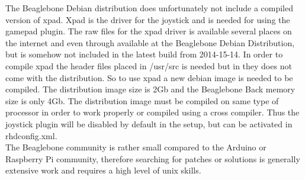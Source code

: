 \noindent
The Beaglebone Debian distribution does unfortunately not include a compiled version of xpad. Xpad is the driver for the joystick and is needed for using the gamepad plugin. The raw files for the xpad driver is available several places on the internet and even through available at the Beaglebone Debian Distribution, but is somehow not included in the latest build from 2014-15-14. In order to compile xpad the header files placed in /usr/src is needed but in they does not come with the distribution. So to use xpad a new debian image is needed to be compiled. The distribution image size is 2Gb and the Beaglebone Back memory size is only 4Gb. The distribution image must be compiled on same type of processor in order to work properly or compiled using a cross compiler. Thus the joystick plugin will be disabled by default in the setup, but can be activated in rhdconfig.xml.\\

\noindent
The Beaglebone community is rather small compared to the Arduino or Raspberry Pi community, therefore searching for patches or solutions is generally extensive work and requires a high level of unix skills. 






 
